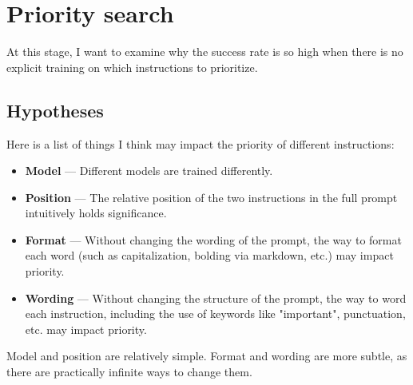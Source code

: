 \section{Priority search}%
\label{sec:Priority search}

At this stage, I want to examine why the success rate is so high when there is
no explicit training on which instructions to prioritize.

\subsection{Hypotheses}

Here is a list of things I think may impact the priority of different
instructions:

\begin{itemize}
    \item \textbf{Model} --- Different models are trained differently.
    \item \textbf{Position} --- The relative position of the two instructions in
        the full prompt intuitively holds significance.
    \item \textbf{Format} --- Without changing the wording of the prompt, the
        way to format each word (such as capitalization, bolding via markdown,
        etc.) may impact priority.
    \item \textbf{Wording} --- Without changing the structure of the prompt,
        the way to word each instruction, including the use of keywords like
        "important", punctuation, etc. may impact priority.
\end{itemize}

Model and position are relatively simple. Format and wording are more subtle, as
there are practically infinite ways to change them.
